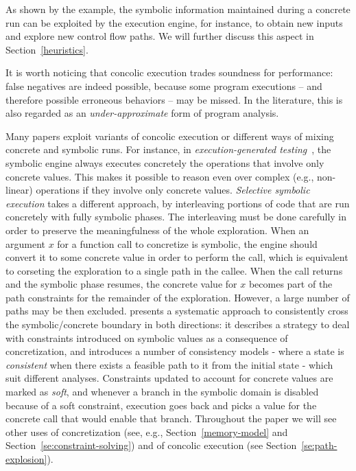 \vspace{2mm}
\noindent As shown by the example, the symbolic information maintained during a concrete run can be exploited by the execution engine, for instance, to obtain new inputs and explore new control flow paths. We will further discuss this aspect in Section~\ref{heuristics}. 

It is worth noticing that concolic execution trades soundness for performance: false negatives are indeed possible, because some program executions -- and therefore possible erroneous behaviors -- may be missed. In the literature, this is also regarded as an {\em under-approximate} form of program analysis.

Many papers exploit variants of concolic execution or different ways of mixing concrete and symbolic runs. For instance, in {\em execution-generated testing}~\cite{KLEE-OSDI08,EXE-CCS06,CS-CACM13}, the symbolic engine always executes concretely the operations that involve only concrete values. This makes it possible to reason even over complex (e.g., non-linear) operations if they involve only concrete values. {\em Selective symbolic execution} takes a different approach, by interleaving portions of code that are run concretely with fully symbolic phases.%
The interleaving must be done carefully in order to preserve the meaningfulness of the whole exploration. When an argument $x$ for a function call to concretize is symbolic, the engine should convert it to some concrete value in order to perform the call, which is equivalent to corseting the exploration to a single path in the callee. When the call returns and the symbolic phase resumes, the concrete value for $x$ becomes part of the path constraints for the remainder of the exploration. However, a large number of paths may be then excluded. \cite{CKC-TOCS12} presents a systematic approach to consistently cross the symbolic/concrete boundary in both directions: it describes a strategy to deal with constraints introduced on symbolic values as a consequence of concretization, and introduces a number of consistency models - where a state is {\em consistent} when there exists a feasible path to it from the initial state - which suit different analyses. Constraints updated to account for concrete values are marked as {\em soft}, and whenever a branch in the symbolic domain is disabled because of a soft constraint, execution goes back and picks a value for the concrete call that would enable that branch. Throughout the paper we will see other uses of concretization (see, e.g., Section~\ref{memory-model} and Section~\ref{se:constraint-solving})  and of concolic execution (see Section~\ref{se:path-explosion}).


